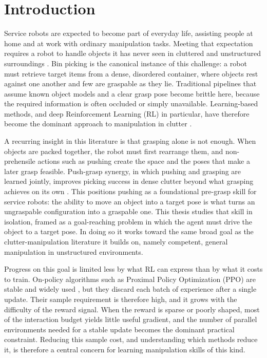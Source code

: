 \section{Introduction}
\label{sec:introduction}

Service robots are expected to become part of everyday life, assisting people at
home and at work with ordinary manipulation tasks. Meeting that expectation
requires a robot to handle objects it has never seen in cluttered and
unstructured surroundings \cite{Mohammed2022ClutterReview}. Bin picking is the
canonical instance of this challenge: a robot must retrieve target items from a
dense, disordered container, where objects rest against one another and few are
graspable as they lie. Traditional pipelines that assume known object models and
a clear grasp pose become brittle here, because the required information is often
occluded or simply unavailable. Learning-based methods, and deep Reinforcement
Learning (RL) in particular, have therefore become the dominant approach to
manipulation in clutter \cite{Mohammed2022ClutterReview}.

A recurring insight in this literature is that grasping alone is not enough. When
objects are packed together, the robot must first rearrange them, and
non-prehensile actions such as pushing create the space and the poses that make a
later grasp feasible. Push-grasp synergy, in which pushing and grasping are learned
jointly, improves picking success in dense clutter beyond what grasping achieves
on its own \cite{Zeng2018VPG, Mokhtar2022SelfSupervisedLF, Kasaei2024HarnessingTS}.
This positions pushing as a foundational pre-grasp skill for service robots: the
ability to move an object into a target pose is what turns an ungraspable
configuration into a graspable one. This thesis studies that skill in isolation,
framed as a goal-reaching problem in which the agent must drive the object to a
target pose. In doing so it works toward the same broad goal as the
clutter-manipulation literature it builds on, namely competent, general
manipulation in unstructured environments.

Progress on this goal is limited less by what RL can express than by what it costs
to train. On-policy algorithms such as Proximal Policy Optimization (PPO) are
stable and widely used \cite{Schulman2017ProximalPO}, but they discard each batch
of experience after a single update. Their sample requirement is therefore high,
and it grows with the difficulty of the reward signal. When the reward is sparse
or poorly shaped, most of the interaction budget yields little useful gradient,
and the number of parallel environments needed for a stable update becomes the
dominant practical constraint. Reducing this sample cost, and understanding which
methods reduce it, is therefore a central concern for learning manipulation skills
of this kind.

